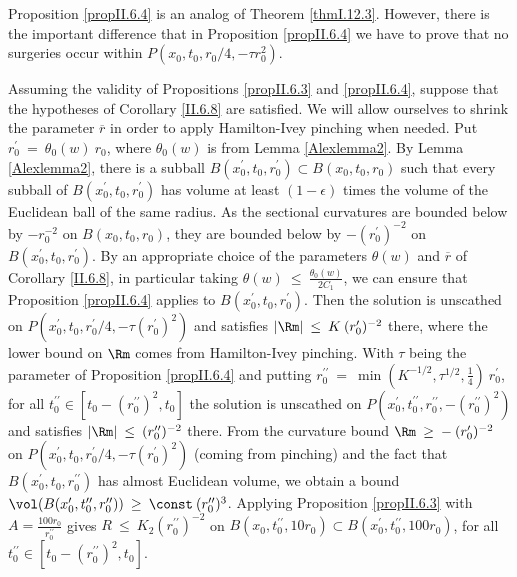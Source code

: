 Proposition \ref{propII.6.4} is an analog of Theorem \ref{thmI.12.3}. However,
there is the important difference that in Proposition \ref{propII.6.4}
we have to prove that no surgeries occur within
$P(x_0, t_0, r_0/4, - \tau r_0^2)$.


Assuming the validity of Propositions \ref{propII.6.3} and \ref{propII.6.4},
suppose that the hypotheses of Corollary \ref{II.6.8} are satisfied.
We will allow ourselves to shrink the parameter $\overline{r}$ in order
to apply Hamilton-Ivey pinching when needed.
Put $r_0^\prime \: = \: \theta_0(w) \: r_0$, where $\theta_0(w)$ is
from Lemma \ref{Alexlemma2}.
By Lemma \ref{Alexlemma2}, there is a subball $B(x_0^\prime, t_0, r_0^\prime) \subset
B(x_0, t_0, r_0)$ such that every subball of
$B(x_0^\prime,t_0, r_0^\prime)$ has volume at least
$(1-\epsilon)$ times the volume of the Euclidean ball of the same
radius.  As the sectional curvatures are bounded below by $- r_0^{-2}$ on
$B(x_0, t_0, r_0)$, they are bounded below by $- (r_0^\prime)^{-2}$ on
$B(x^\prime_0, t_0, r_0^\prime)$. By an appropriate choice of the
parameters $\theta(w)$ and $\overline{r}$ of Corollary \ref{II.6.8},
in particular taking $\theta(w) \: \le \: \frac{\theta_0(w)}{2C_1}$, we can
ensure that Proposition \ref{propII.6.4}
applies to $B(x^\prime_0, t_0, r_0^\prime)$.
Then the solution is unscathed on
$P(x_0^\prime, t_0, r_0^\prime/4, - \tau (r_0^\prime)^2)$ and satisfies
$|\Rm| \: \le \: K \: (r_0^\prime)^{-2}$ there, where the lower
bound on $\Rm$ comes from Hamilton-Ivey pinching.
With $\tau$ being the parameter of Proposition \ref{propII.6.4} and
putting
$r_0^{\prime \prime} \: = \: \min(K^{-1/2}, \tau^{1/2}, \frac14) \: r_0^\prime$,
for all $t_0^{\prime \prime} \in
[t_0 - (r_0^{\prime \prime})^2, t_0]$ the
solution is unscathed on $P(x_0^\prime, t_0^{\prime \prime},
r_0^{\prime \prime}, -(r_0^{\prime \prime})^2)$ and satisfies
$|\Rm| \: \le \: (r_0^{\prime \prime})^{-2}$ there.
From the curvature bound $\Rm \: \ge \: - \: (r_0^\prime)^{-2}$ on
$P(x_0^\prime, t_0, r_0^\prime/4, - \tau (r_0^\prime)^2)$
(coming from pinching)
and the fact that $B(x^\prime_0, t_0, r_0^{\prime \prime})$
has almost Euclidean volume, we obtain a bound
$\vol(B(x^\prime_0, t_0^{\prime \prime},
r_0^{\prime \prime})) \: \ge \: \const \:
(r_0^{\prime \prime})^{3}$.
Applying Proposition \ref{propII.6.3} with
$A = \frac{100r_0}{r_0^{\prime \prime}}$ gives
$R \: \le \: K_2 (r_0^{\prime \prime})^{-2}$ on
$B(x_0, t_0^{\prime \prime}, 10 r_0) \subset
B(x_0^\prime, t_0^{\prime \prime}, 100 r_0)$,
for all $t_0^{\prime \prime} \in
[t_0 - (r_0^{\prime \prime})^2, t_0]$.
